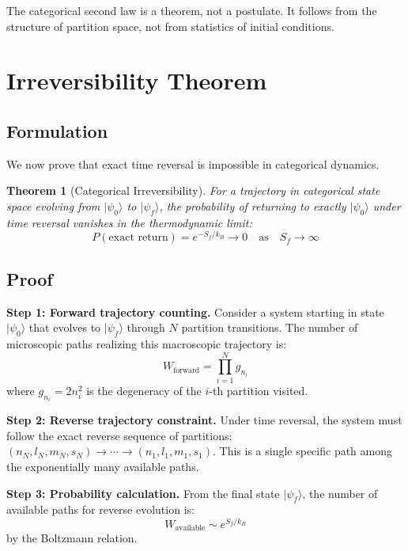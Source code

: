 \documentclass[twocolumn,10pt]{article}
\newtheorem{theorem}{Theorem}[section]
\begin{document}
The categorical second law is a theorem, not a postulate. It follows from the structure of partition space, not from statistics of initial conditions.

\section{Irreversibility Theorem}
\label{sec:irreversibility}

\subsection{Formulation}

We now prove that exact time reversal is impossible in categorical dynamics.

\begin{theorem}[Categorical Irreversibility]
\label{thm:irreversibility}
For a trajectory in categorical state space evolving from $|\psi_0\rangle$ to $|\psi_f\rangle$, the probability of returning to exactly $|\psi_0\rangle$ under time reversal vanishes in the thermodynamic limit:
\begin{equation}
    P(\text{exact return}) = e^{-S_f/k_B} \to 0 \quad \text{as} \quad S_f \to \infty
\end{equation}
\end{theorem}

\subsection{Proof}

\textbf{Step 1: Forward trajectory counting.}
Consider a system starting in state $|\psi_0\rangle$ that evolves to $|\psi_f\rangle$ through $N$ partition transitions. The number of microscopic paths realizing this macroscopic trajectory is:
\begin{equation}
    W_{\text{forward}} = \prod_{i=1}^{N} g_{n_i}
\end{equation}
where $g_{n_i} = 2n_i^2$ is the degeneracy of the $i$-th partition visited.

\textbf{Step 2: Reverse trajectory constraint.}
Under time reversal, the system must follow the exact reverse sequence of partitions: $(n_N, l_N, m_N, s_N) \to \cdots \to (n_1, l_1, m_1, s_1)$. This is a single specific path among the exponentially many available paths.

\textbf{Step 3: Probability calculation.}
From the final state $|\psi_f\rangle$, the number of available paths for reverse evolution is:
\begin{equation}
    W_{\text{available}} \sim e^{S_f/k_B}
\end{equation}
by the Boltzmann relation.
\end{document}
